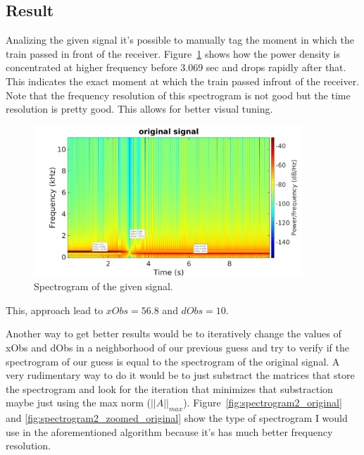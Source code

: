 \subsection{Result}

Analizing the given signal it's possible to manually tag the moment in which the
train passed in front of the receiver. Figure~\ref{fig:spectrogram_original}
shows how the power density is concentrated at higher frequency before 3.069 sec
and drops rapidly after that. This indicates the exact moment at which the train
passed infront of the receiver. Note that the frequency resolution of this
spectrogram is not good but the time resolution is pretty good. This allows for
better visual tuning.

\begin{figure}[H]
	\centering
	\includegraphics[width=0.9\textwidth]{figs/ex1_spectrogram_orig.png}
	\caption{Spectrogram of the given signal.}
	\label{fig:spectrogram_original}
\end{figure}

This, approach lead to $xObs = 56.8$ and $dObs = 10$.

Another way to get better results would be to iteratively change the values of
xObs and dObs in a neighborhood of our previous guess and try to verify if the
spectrogram of our guess is equal to the spectrogram of the original signal. A
very rudimentary way to do it would be to just substract the matrices that
store the spectrogram and look for the iteration that minimizes that substraction
maybe just using the max norm ($||A||_{max}$). Figure~\ref{fig:spectrogram2_original}
and \ref{fig:spectrogram2_zoomed_original} show the type of spectrogram I would
use in the aforementioned algorithm because it's has much better frequency
resolution.

